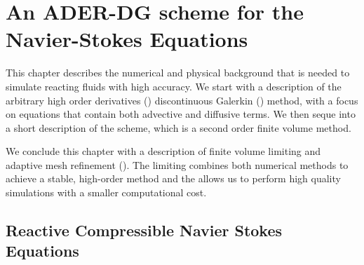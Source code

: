 \chapter{An ADER-DG scheme for the Navier-Stokes Equations}\label{chap:methods}
This chapter describes the numerical and physical background that is needed to simulate reacting fluids with high accuracy.
We start with a description of the arbitrary high order derivatives (\ader{}) discontinuous Galerkin (\dg{}) method, with a focus on equations that contain both advective and diffusive terms.
We then seque into a short description of the \muscl{} scheme, which is a second order finite volume method.

We conclude this chapter with a description of finite volume limiting and adaptive mesh refinement (\amr{}).
The limiting combines both numerical methods to achieve a stable, high-order method and the \amr{} allows us to perform high quality simulations with a smaller computational cost.
\section{Reactive Compressible Navier Stokes Equations}\label{sec:navier-stokes}
\newcommand{\diffCoeff}{\varepsilon}
\newcommand{\hyperFluxDef}{
  \begin{pmatrix}
    \Qj \\
    \Qv  \otimes \Qj + \bm{I} \pressure  \\
    \Qv \cdot (\bm{I} \QE + \bm{I} \pressure) \\
    \Qj \QZZ
  \end{pmatrix}
}
\newcommand{\viscFluxDef}{
  \begin{pmatrix}
    0\\
     \stressT (\Q, \gradQ)  \\
     \Qv \cdot \stressT (\Q, \gradQ) - \kappa \gradient{T}\\
     0\\
   \end{pmatrix}
}


